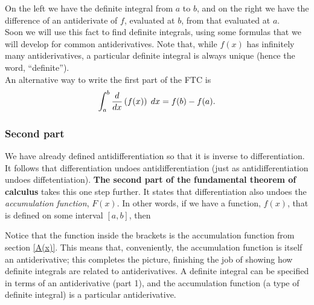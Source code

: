   	\bigskip
	
	\hfil{}
	\bigskip
	\bigskip


\noindent On the left we have the definite integral from $a$ to $b$, and on the right we have the difference of an antiderivate of $f$, evaluated at $b$, from that evaluated at $a$.  \\

\noindent Soon we will use this fact to find definite integrals, using some formulas that we will develop for common antiderivatives. Note that, while $f(x)$ has infinitely many antiderivatives, a particular definite integral is always unique (hence the word, ``definite''). \\

\noindent An alternative way to write the first part of the FTC is
\[
\int_a^b \frac{d}{dx}\left(f(x)\right) \; dx = f(b) - f(a).
\]

\subsubsection{Second part}
We have already defined antidifferentiation so that it is inverse to differentiation. It follows that differentiation undoes antidifferentiation (just as antidifferentiation undoes diffetentiation).  \textbf{The second part of the fundamental theorem of calculus} takes this one step further. It states that differentiation also undoes the \textit{accumulation function}, $F(x)$. In other words, if we have a function, $f(x)$, that is defined on some interval $[a,b]$, then

  	\bigskip
	
	\hfil{}
	\bigskip
	\bigskip

\noindent Notice that the function inside the brackets is the accumulation function from section \ref{A(x)}. This means that, conveniently, the accumulation function is itself an antiderivative; this completes the picture, finishing the job of showing how definite integrals are related to antiderivatives. A definite integral can be specified in terms of an antiderivative (part 1), and the accumulation function (a type of definite integral) is a particular antiderivative. \\

